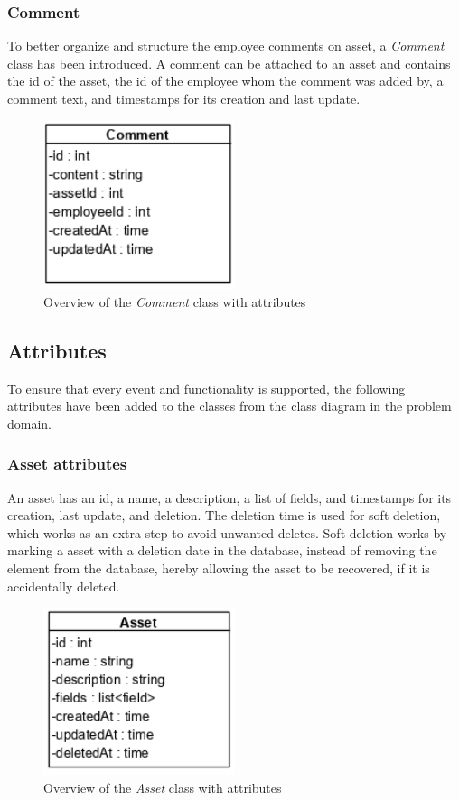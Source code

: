 \subsubsection{Comment}
To better organize and structure the employee comments on asset, a \textit{Comment} class has been introduced. A comment can be attached to an asset and contains the id of the asset, the id of the employee whom the comment was added by, a comment text, and timestamps for its creation and last update.
\begin{figure}[H]
    \centering
    \includegraphics[width=0.5\textwidth]{figures/Classes/CommentAttributes.png}
    \caption{Overview of the \textit{Comment} class with attributes}
    \label{fig:CommentWithAttributes}
\end{figure}

\subsection{Attributes}
To ensure that every event and functionality is supported, the following attributes have been added to the classes from the class diagram in the problem domain.

\subsubsection{Asset attributes}
An asset has an id, a name, a description, a list of fields, and timestamps for its creation, last update, and deletion. The deletion time is used for soft deletion, which works as an extra step to avoid unwanted deletes. Soft deletion works by marking a asset with a deletion date in the database, instead of removing the element from the database, hereby allowing the asset to be recovered, if it is accidentally deleted.

\begin{figure}[H]
    \centering
    \includegraphics[width=0.5\textwidth]{figures/Classes/AssetAttributes.png}
    \caption{Overview of the \textit{Asset} class with attributes}
    \label{fig:AssetWithAttributes}
\end{figure}

